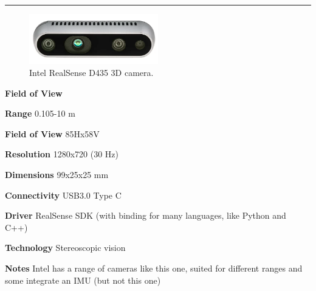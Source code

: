 \documentclass[../main.tex]{subfiles}
\begin{document}
\noindent\rule{8cm}{0.1pt}
\begin{figure}[H]
    \centering
    \includegraphics[width=0.5\textwidth]{images/realsenseD435.png}
    \caption{Intel RealSense D435 3D camera.}
    \label{fig:realsenseD435}
\end{figure}
\begin{labeling}{\textbf{Field of View    }}
    \setlength{\itemindent}{2em}
    \item [\textbf{Range}] 0.105-10 m
    \item [\textbf{Field of View}] 85Hx58V
    \item [\textbf{Resolution}] 1280x720 (30 Hz)
    \item [\textbf{Dimensions}] 99x25x25 mm
    \item [\textbf{Connectivity}] USB3.0 Type C
    \item [\textbf{Driver}] RealSense SDK (with binding for many languages, like Python and C++)
    \item [\textbf{Technology}] Stereoscopic vision
    \item [\textbf{Notes}] Intel has a range of cameras like this one, suited for different ranges and some integrate an IMU (but not this one)
\end{labeling}



\end{document}
